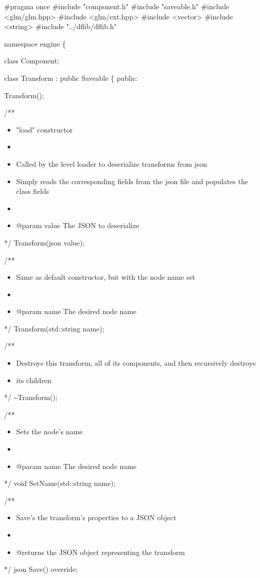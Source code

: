 \documentclass[11pt]{article}
\date{\today}
\title{}
\begin{document}
\tableofcontents

\#pragma once
\#include "component.h"
\#include "saveable.h"
\#include <glm/glm.hpp>
\#include <glm/ext.hpp>
\#include <vector>
\#include <string>
\#include "../dflib/dflib.h"

namespace engine \{

class Component;

class Transform : public Saveable \{
public:

Transform();

/**
\begin{itemize}
\item "load" constructor
\item 

\item Called by the level loader to deserialize transforms from json
\item Simply reads the corresponding fields from the json file and populates the class fields
\item 

\item @param value The JSON to deserialize
\end{itemize}
 */
Transform(json value);

/**
\begin{itemize}
\item Same as default constructor, but with the node name set
\item 

\item @param name The desired node name
\end{itemize}
 */
Transform(std::string name);

/**
\begin{itemize}
\item Destroys this transform, all of its components, and then recursively destroys
\item its children
\end{itemize}
 */
\textasciitilde{}Transform();

/**
\begin{itemize}
\item Sets the node's name
\item 

\item @param name The desired node name
\end{itemize}
 */
void SetName(std::string name);

/**
\begin{itemize}
\item Save's the transform's properties to a JSON object
\item 

\item @returns the JSON object representing the transform
\end{itemize}
 */
json Save() override;
\end{document}
